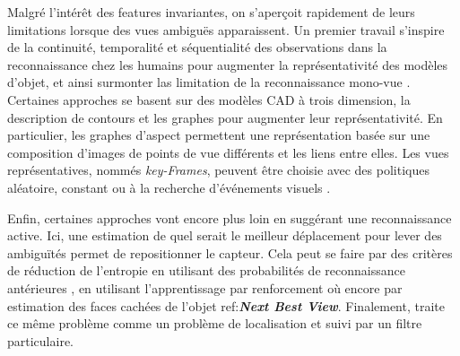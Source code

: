 Malgré l'intérêt des features invariantes, on s'aperçoit rapidement de leurs limitations lorsque des vues ambiguës apparaissent. Un premier travail s'inspire de la continuité, temporalité et séquentialité des observations dans la reconnaissance chez les humains pour augmenter la représentativité des modèles d'objet, et ainsi surmonter las limitation de la reconnaissance mono-vue . Certaines approches se basent sur des modèles CAD à trois dimension, la description de contours et les graphes \cite{roy2000isolated} pour augmenter leur représentativité. En particulier, les graphes d'aspect  permettent une représentation basée sur une composition d'images de points de vue différents et les liens entre elles.  Les vues représentatives, nommés \textit{key-Frames}, peuvent être choisie avec des politiques aléatoire, constant ou à la recherche d'événements visuels . 
  
Enfin, certaines approches vont encore plus loin en suggérant une reconnaissance active. Ici, une estimation de quel serait le meilleur déplacement pour lever des ambiguïtés permet de repositionner le capteur. Cela peut se faire par des critères de réduction de l'entropie en utilisant des probabilités de reconnaissance antérieures \cite{borotschnig1998active}, en utilisant l'apprentissage par renforcement \cite{borji2009learning} où encore par estimation des faces cachées de l'objet  ref:\textbf{\textit{Next Best View}}. Finalement, \cite{browatzki2012active} traite ce même problème comme un problème de localisation et suivi par un filtre particulaire.

